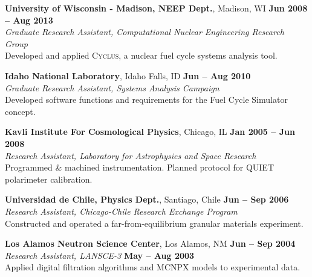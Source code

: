 \documentclass[margin,line]{resume}
\newcommand{\Cyclus}{\textsc{Cyclus}\xspace}%
\begin{document}
\begin{resume}
    \textbf{University of Wisconsin - Madison, NEEP Dept.}, Madison, WI \hfill \textbf{Jun 2008 -- Aug 2013}\\
                \textsl{Graduate Research Assistant, Computational Nuclear Engineering Research Group}\\
                Developed and applied \Cyclus, a nuclear fuel cycle systems analysis tool.

    \textbf{Idaho National Laboratory}, Idaho Falls, ID \hfill \textbf{Jun -- Aug 2010}\\
                \textsl{Graduate Research Assistant, Systems Analysis Campaign}\\
                Developed software functions and requirements for the Fuel Cycle Simulator concept.

    \textbf{Kavli Institute For Cosmological Physics}, Chicago, IL \hfill \textbf{Jan 2005 -- Jun 2008}\\
                \textsl{Research Assistant, Laboratory for Astrophysics and Space Research}\\
                Programmed \& machined instrumentation. Planned protocol for QUIET polarimeter calibration.

    \textbf{Universidad de Chile, Physics Dept.}, Santiago, Chile \hfill \textbf{Jun -- Sep 2006}\\
                \textsl{Research Assistant, Chicago-Chile Research Exchange Program}\\
                 Constructed and operated a far-from-equilibrium granular
                 materials experiment.

    \textbf{Los Alamos Neutron Science Center}, Los Alamos, NM \hfill \textbf{Jun -- Sep 2004}\\
                \textsl{Research Assistant, LANSCE-3} \hfill \textbf{May -- Aug 2003}\\
                Applied digital filtration algorithms and MCNPX models to experimental data.

\end{resume}
\end{document}
